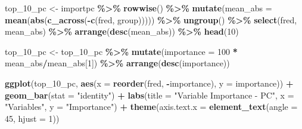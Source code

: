\documentclass[
]{article}
\newenvironment{Shaded}{\begin{snugshade}}{\end{snugshade}}
\newcommand{\AttributeTok}[1]{\textcolor[rgb]{0.13,0.29,0.53}{#1}}
\newcommand{\DecValTok}[1]{\textcolor[rgb]{0.00,0.00,0.81}{#1}}
\newcommand{\FunctionTok}[1]{\textcolor[rgb]{0.13,0.29,0.53}{\textbf{#1}}}
\newcommand{\NormalTok}[1]{#1}
\newcommand{\OtherTok}[1]{\textcolor[rgb]{0.56,0.35,0.01}{#1}}
\newcommand{\SpecialCharTok}[1]{\textcolor[rgb]{0.81,0.36,0.00}{\textbf{#1}}}
\newcommand{\StringTok}[1]{\textcolor[rgb]{0.31,0.60,0.02}{#1}}
\begin{document}
\begin{Shaded}
\begin{Highlighting}[]
\NormalTok{top\_10\_pc }\OtherTok{\textless{}{-}}\NormalTok{ importpc }\SpecialCharTok{\%\textgreater{}\%}
    \FunctionTok{rowwise}\NormalTok{() }\SpecialCharTok{\%\textgreater{}\%}
    \FunctionTok{mutate}\NormalTok{(}\AttributeTok{mean\_abs =} \FunctionTok{mean}\NormalTok{(}\FunctionTok{abs}\NormalTok{(}\FunctionTok{c\_across}\NormalTok{(}\SpecialCharTok{{-}}\FunctionTok{c}\NormalTok{(fred, group))))) }\SpecialCharTok{\%\textgreater{}\%}
    \FunctionTok{ungroup}\NormalTok{() }\SpecialCharTok{\%\textgreater{}\%}
    \FunctionTok{select}\NormalTok{(fred, mean\_abs) }\SpecialCharTok{\%\textgreater{}\%}
    \FunctionTok{arrange}\NormalTok{(}\FunctionTok{desc}\NormalTok{(mean\_abs)) }\SpecialCharTok{\%\textgreater{}\%}
    \FunctionTok{head}\NormalTok{(}\DecValTok{10}\NormalTok{)}

\NormalTok{top\_10\_pc }\OtherTok{\textless{}{-}}\NormalTok{ top\_10\_pc }\SpecialCharTok{\%\textgreater{}\%}
    \FunctionTok{mutate}\NormalTok{(}\AttributeTok{importance =} \DecValTok{100} \SpecialCharTok{*}\NormalTok{ mean\_abs}\SpecialCharTok{/}\NormalTok{mean\_abs[}\DecValTok{1}\NormalTok{]) }\SpecialCharTok{\%\textgreater{}\%}
    \FunctionTok{arrange}\NormalTok{(}\FunctionTok{desc}\NormalTok{(importance))}

\FunctionTok{ggplot}\NormalTok{(top\_10\_pc, }\FunctionTok{aes}\NormalTok{(}\AttributeTok{x =} \FunctionTok{reorder}\NormalTok{(fred, }\SpecialCharTok{{-}}\NormalTok{importance), }\AttributeTok{y =}\NormalTok{ importance)) }\SpecialCharTok{+}
    \FunctionTok{geom\_bar}\NormalTok{(}\AttributeTok{stat =} \StringTok{"identity"}\NormalTok{) }\SpecialCharTok{+} \FunctionTok{labs}\NormalTok{(}\AttributeTok{title =} \StringTok{"Variable Importance {-} PC"}\NormalTok{,}
    \AttributeTok{x =} \StringTok{"Variables"}\NormalTok{, }\AttributeTok{y =} \StringTok{"Importance"}\NormalTok{) }\SpecialCharTok{+} \FunctionTok{theme}\NormalTok{(}\AttributeTok{axis.text.x =} \FunctionTok{element\_text}\NormalTok{(}\AttributeTok{angle =} \DecValTok{45}\NormalTok{,}
    \AttributeTok{hjust =} \DecValTok{1}\NormalTok{))}
\end{Highlighting}
\end{Shaded}
\end{document}
